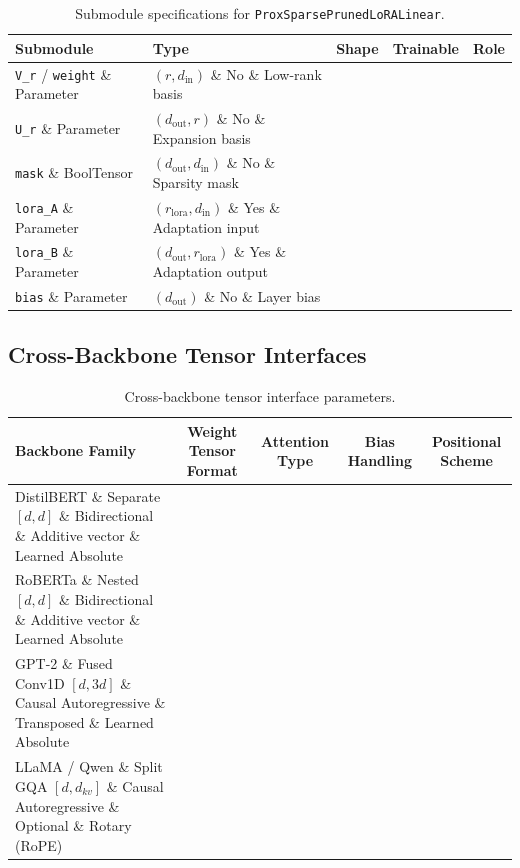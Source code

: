 \begin{table}[H]
\centering
\small
\begin{tabularx}{\linewidth}{llccX}
\toprule
\textbf{Submodule} & \textbf{Type} & \textbf{Shape} & \textbf{Trainable} & \textbf{Role} \\
\midrule
\texttt{V\_r} / \texttt{weight} \& Parameter & $(r, d_{\text{in}})$ \& No \& Low-rank basis \\
\texttt{U\_r} \& Parameter & $(d_{\text{out}}, r)$ \& No \& Expansion basis \\
\texttt{mask} \& BoolTensor & $(d_{\text{out}}, d_{\text{in}})$ \& No \& Sparsity mask \\
\texttt{lora\_A} \& Parameter & $(r_{\text{lora}}, d_{\text{in}})$ \& Yes \& Adaptation input \\
\texttt{lora\_B} \& Parameter & $(d_{\text{out}}, r_{\text{lora}})$ \& Yes \& Adaptation output \\
\texttt{bias} \& Parameter & $(d_{\text{out}})$ \& No \& Layer bias \\
\bottomrule
\end{tabularx}
\caption{Submodule specifications for \texttt{ProxSparsePrunedLoRALinear}.}
\label{tab:submodules_proxsparse_pruner}
\end{table}

\subsection{Cross-Backbone Tensor Interfaces}
\begin{table}[H]
\centering
\small
\begin{tabularx}{\linewidth}{lcccc}
\toprule
\textbf{Backbone Family} & \textbf{Weight Tensor Format} & \textbf{Attention Type} & \textbf{Bias Handling} & \textbf{Positional Scheme} \\
\midrule
DistilBERT \& Separate $[d, d]$ \& Bidirectional \& Additive vector \& Learned Absolute \\
RoBERTa \& Nested $[d, d]$ \& Bidirectional \& Additive vector \& Learned Absolute \\
GPT-2 \& Fused Conv1D $[d, 3d]$ \& Causal Autoregressive \& Transposed \& Learned Absolute \\
LLaMA / Qwen \& Split GQA $[d, d_{kv}]$ \& Causal Autoregressive \& Optional \& Rotary (RoPE) \\
\bottomrule
\end{tabularx}
\caption{Cross-backbone tensor interface parameters.}
\label{tab:backbone_interfaces}
\end{table}

